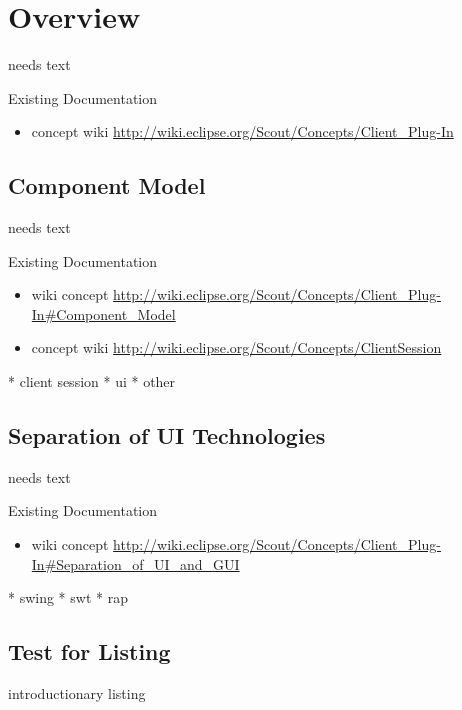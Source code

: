 \documentclass[a4paper,10pt,twoside]{book}
\begin{document}
  \sloppy
\fi


\chapter{Overview}

needs text
  
\noindent Existing Documentation
\begin{itemize}
  \item concept wiki \url{http://wiki.eclipse.org/Scout/Concepts/Client_Plug-In}
\end{itemize}

\section{Component Model}
needs text

\noindent Existing Documentation
\begin{itemize}
  \item wiki concept \url{http://wiki.eclipse.org/Scout/Concepts/Client_Plug-In#Component_Model}
  \item concept wiki \url{http://wiki.eclipse.org/Scout/Concepts/ClientSession}
\end{itemize}

  * client session
  * ui
  * other
  
\section{Separation of UI Technologies}
needs text

\noindent Existing Documentation
\begin{itemize}
  \item wiki concept \url{http://wiki.eclipse.org/Scout/Concepts/Client_Plug-In#Separation_of_UI_and_GUI}
\end{itemize}
  
  * swing
  * swt
  * rap

\section{Test for Listing}

introductionary listing
\end{document}
